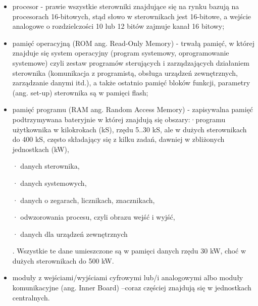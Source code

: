 \documentclass{article}
\begin{document}
	\begin{itemize}
		
	\item procesor - prawie wszystkie sterowniki znajdujące się na rynku bazują na procesorach 16-bitowych, stąd słowo w sterownikach jest 16-bitowe, a wejście analogowe o rozdzielczości 10 lub 12 bitów zajmuje kanał 16 bitowy;
	
	\item pamięć operacyjną (ROM ang. Read-Only Memory) - trwałą pamięć, w której znajduje się system operacyjny (program systemowy, oprogramowanie systemowe) czyli zestaw programów sterujących i zarządzających działaniem sterownika (komunikacja z programistą, obsługa urządzeń zewnętrznych, zarządzanie danymi itd.), a także ostatnio pamięć bloków funkcji, parametry (ang. set-up) sterownika są w pamięci flash;
	
	\item pamięć programu (RAM ang. Random Access Memory) - zapisywalna pamięć podtrzymywana bateryjnie w której znajdują się obszary:·programu użytkownika w kilokrokach (kS), rzędu 5..30 kS, ale w dużych sterownikach do 400 kS, często składający się z kilku zadań, dawniej w zbliżonych jednostkach (kW),
	
	· danych sterownika,
	
	· danych systemowych,
	
	· danych o zegarach, licznikach, znacznikach,
	
	· odwzorowania procesu, czyli obrazu wejść i wyjść,
	
	· danych dla urządzeń zewnętrznych
	
	. Wszystkie te dane umieszczone są w pamięci danych rzędu 30 kW, choć w dużych sterownikach do 500 kW.
	
	\item moduły z wejściami/wyjściami cyfrowymi lub/i analogowymi albo moduły komunikacyjne (ang. Inner Board) –coraz częściej znajdują się w jednostkach centralnych.
	
	\end{itemize}
	
\label{LastPage}
\end{document}
